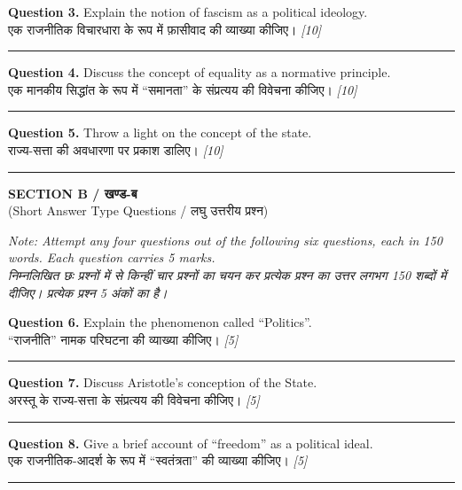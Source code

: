 \documentclass[11pt,a4paper]{article}
\newcommand{\pts}[1]{\hfill \textit{[#1]}}
\begin{document}
\noindent \textbf{Question 3.} Explain the notion of fascism as a political ideology.\\[1pt]
एक राजनीतिक विचारधारा के रूप में फ़ासीवाद की व्याख्या कीजिए। \pts{10}

\medskip\rule{\linewidth}{0.2pt}\medskip

\noindent \textbf{Question 4.} Discuss the concept of equality as a normative principle.\\[1pt]
एक मानकीय सिद्धांत के रूप में ``समानता'' के संप्रत्यय की विवेचना कीजिए। \pts{10}

\medskip\rule{\linewidth}{0.2pt}\medskip

\noindent \textbf{Question 5.} Throw a light on the concept of the state.\\[1pt]
राज्य-सत्ता की अवधारणा पर प्रकाश डालिए। \pts{10}

\bigskip
\rule{\linewidth}{0.2pt}
\bigskip

\begin{center}
  {\large\bfseries SECTION B / खण्ड-ब}\\[2pt]
  {\normalsize (Short Answer Type Questions / लघु उत्तरीय प्रश्न)}
\end{center}

\noindent \textit{Note: Attempt any four questions out of the following six questions, each in 150 words. Each question carries 5 marks.}\\[2pt]
\noindent \textit{निम्नलिखित छः प्रश्नों में से किन्हीं चार प्रश्नों का चयन कर प्रत्येक प्रश्न का उत्तर लगभग 150 शब्दों में दीजिए। प्रत्येक प्रश्न 5 अंकों का है।}

\bigskip

\noindent \textbf{Question 6.} Explain the phenomenon called ``Politics''.\\[1pt]
``राजनीति'' नामक परिघटना की व्याख्या कीजिए। \pts{5}

\medskip\rule{\linewidth}{0.2pt}\medskip

\noindent \textbf{Question 7.} Discuss Aristotle's conception of the State.\\[1pt]
अरस्तू के राज्य-सत्ता के संप्रत्यय की विवेचना कीजिए। \pts{5}

\medskip\rule{\linewidth}{0.2pt}\medskip

\noindent \textbf{Question 8.} Give a brief account of ``freedom'' as a political ideal.\\[1pt]
एक राजनीतिक-आदर्श के रूप में ``स्वतंत्रता'' की व्याख्या कीजिए। \pts{5}

\medskip\rule{\linewidth}{0.2pt}\medskip
\end{document}
